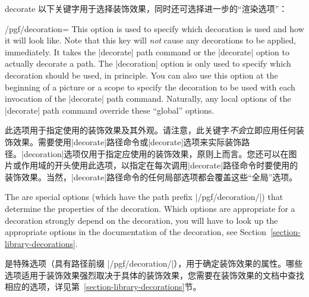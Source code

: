 \begin{pathoperation}{decorate}{}
    以下关键字用于选择装饰效果，同时还可选择进一步的“渲染选项”：

    \begin{key}{/pgf/decoration=}
        This option is used to specify which decoration is used and how it will
        look like. Note that this key will \emph{not} cause any decorations to
        be applied, immediately. It takes the |decorate| path command or the
        |decorate| option to actually decorate a path. The |decoration| option
        is only used to specify which decoration should be used, in principle.
        You can also use this option at the beginning of a picture or a scope
        to specify the decoration to be used with each invocation of the
        |decorate| path command. Naturally, any local options of the |decorate|
        path command override these ``global'' options.

        此选项用于指定使用的装饰效果及其外观。请注意，此关键字\emph{不会}立即应用任何装饰效果。需要使用|decorate|路径命令或|decorate|选项来实际装饰路径。|decoration|选项仅用于指定应使用的装饰效果，原则上而言。您还可以在图片或作用域的开头使用此选项，以指定在每次调用|decorate|路径命令时要使用的装饰效果。当然，|decorate|路径命令的任何局部选项都会覆盖这些“全局”选项。
        \begin{codeexample}[preamble={\usetikzlibrary{
    decorations.pathmorphing,
    decorations.shapes,
}}]
\end{codeexample}

        The  are special options (which have the path
        prefix |/pgf/decoration/|) that determine the properties of the
        decoration. Which options are appropriate for a decoration strongly
        depend on the decoration, you will have to look up the appropriate
        options in the documentation of the decoration, see
        Section~\ref{section-library-decorations}.

        是特殊选项（具有路径前缀 |/pgf/decoration/|），用于确定装饰效果的属性。哪些选项适用于装饰效果强烈取决于具体的装饰效果，您需要在装饰效果的文档中查找相应的选项，详见第~\ref{section-library-decorations}节。




\end{key}
\end{pathoperation}
